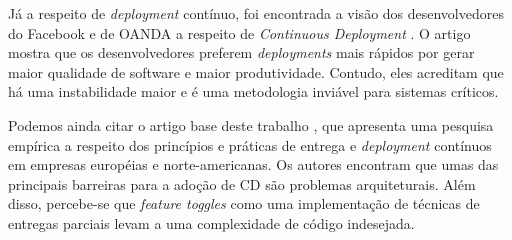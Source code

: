 Já a respeito de \emph{deployment} contínuo, foi encontrada a visão dos desenvolvedores do Facebook e de OANDA a respeito de \emph{Continuous Deployment} \cite{savor2015}. O artigo mostra que os desenvolvedores preferem \emph{deployments} mais rápidos por gerar maior qualidade de software e maior produtividade. Contudo, eles acreditam que há uma instabilidade maior e é uma metodologia inviável para sistemas críticos.

Podemos ainda citar o artigo base deste trabalho \cite{empiricalStudy2016}, que apresenta uma pesquisa empírica a respeito dos princípios e práticas de entrega e \emph{deployment} contínuos em empresas européias e norte-americanas. Os autores encontram que umas das principais barreiras para a adoção de CD são problemas arquiteturais. Além disso, percebe-se que \emph{feature toggles} como uma implementação de técnicas de entregas parciais levam a uma complexidade de código indesejada.
